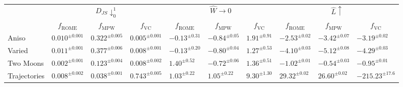 \begin{tabularx}{\textwidth}{X | Y Y Y | Y Y Y | Y Y Y}
\toprule[1pt] 
&  &  &   \\&  &  &  &  &  &  &  &  &   \\ \midrule[1pt]
Aniso & {\scriptsize $0.010^{\pm 0.001}$} & {\scriptsize $0.322^{\pm 0.005}$} & {\scriptsize $0.005^{\pm 0.001}$} & {\scriptsize $-0.13^{\pm 0.31}$} & {\scriptsize $-0.84^{\pm 0.05}$} & {\scriptsize $1.91^{\pm 0.91}$} & {\scriptsize $-2.53^{\pm 0.02}$} & {\scriptsize $-3.42^{\pm 0.07}$} & {\scriptsize $-3.19^{\pm 0.02}$}  \\ \midrule 
Varied & {\scriptsize $0.011^{\pm 0.001}$} & {\scriptsize $0.377^{\pm 0.006}$} & {\scriptsize $0.008^{\pm 0.001}$} & {\scriptsize $-0.13^{\pm 0.20}$} & {\scriptsize $-0.80^{\pm 0.04}$} & {\scriptsize $1.27^{\pm 0.53}$} & {\scriptsize $-4.10^{\pm 0.03}$} & {\scriptsize $-5.12^{\pm 0.08}$} & {\scriptsize $-4.29^{\pm 0.03}$}  \\ \midrule 
Two Moons & {\scriptsize $0.002^{\pm 0.001}$} & {\scriptsize $0.123^{\pm 0.004}$} & {\scriptsize $0.008^{\pm 0.002}$} & {\scriptsize $1.40^{\pm 0.52}$} & {\scriptsize $-0.72^{\pm 0.06}$} & {\scriptsize $1.36^{\pm 0.51}$} & {\scriptsize $-1.02^{\pm 0.01}$} & {\scriptsize $-0.54^{\pm 0.03}$} & {\scriptsize $-0.95^{\pm 0.01}$}  \\ \midrule 
Trajectories & {\scriptsize $0.008^{\pm 0.002}$} & {\scriptsize $0.038^{\pm 0.001}$} & {\scriptsize $0.743^{\pm 0.005}$} & {\scriptsize $1.03^{\pm 0.22}$} & {\scriptsize $1.05^{\pm 0.22}$} & {\scriptsize $9.30^{\pm 1.30}$} & {\scriptsize $29.32^{\pm 0.02}$} & {\scriptsize $26.60^{\pm 0.02}$} & {\scriptsize $-215.23^{\pm 17.6}$}  \\ \bottomrule[1pt]
\end{tabularx} 

